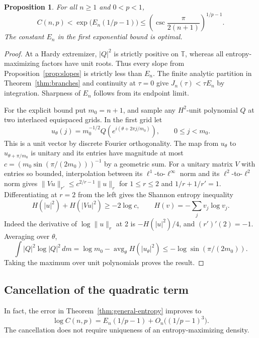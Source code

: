 \documentclass[11pt]{article}
\newtheorem{proposition}[theorem]{Proposition}
\newcommand{\T}{\mathbb T}
\begin{document}
\begin{proposition}
For all \(n\geq1\) and \(0<p<1\),
\[
 C(n,p)<\exp\bigl(E_n(1/p-1)\bigr)
 \leq \left(\csc\frac{\pi}{2(n+1)}\right)^{1/p-1}.
\]
The constant \(E_n\) in the first exponential bound is optimal.
\end{proposition}

\begin{proof}
At a Hardy extremizer, \(|Q|^2\) is strictly positive on
\(\T\), whereas all entropy-maximizing factors have unit roots.
Thus every slope from Proposition~\ref{prop:slopes} is strictly
less than \(E_n\). The finite analytic partition in
Theorem~\ref{thm:branches} and continuity at \(\tau=0\) give
\(J_n(\tau)<\tau E_n\) by integration. Sharpness of \(E_n\)
follows from its endpoint limit.

For the explicit bound put \(m_0=n+1\), and sample any
\(H^2\)-unit polynomial \(Q\) at two interlaced equispaced
grids. In the first grid let
\[
 u_\theta(j)=m_0^{-1/2}
      Q\!\left(e^{i(\theta+2\pi j/m_0)}\right),
 \qquad 0\leq j<m_0 .
\]
This is a unit vector by discrete Fourier orthogonality.
The map from \(u_\theta\) to \(u_{\theta+\pi/m_0}\) is unitary
and its entries have magnitude at most
\(c=(m_0\sin(\pi/(2m_0)))^{-1}\) by a geometric sum.
For a unitary matrix \(V\) with entries so bounded, interpolation
between its \(\ell^1\)-to-\(\ell^\infty\) norm and its
\(\ell^2\)-to-\(\ell^2\) norm gives
\(\|Vu\|_{r'}\leq c^{2/r-1}\|u\|_r\) for \(1\leq r\leq2\)
and \(1/r+1/r'=1\). Differentiating at \(r=2\) from the
left gives the Shannon entropy inequality
\[
 H(|u|^2)+H(|Vu|^2)\geq-2\log c,\qquad
 H(v)=-\sum_j v_j\log v_j .
\]
Indeed the derivative of \(\log\|u\|_r\) at 2 is
\(-H(|u|^2)/4\), and \((r')'(2)=-1\).
Averaging over \(\theta\),
\[
 \int |Q|^2\log |Q|^2\,dm
   =\log m_0-\operatorname{avg}_{\theta}H(|u_\theta|^2)
   \leq-\log\sin(\pi/(2m_0)).
\]
Taking the maximum over unit polynomials proves the result.
\end{proof}

\subsection{Cancellation of the quadratic term}

In fact, the error in Theorem~\ref{thm:general-entropy} improves to
\begin{equation}\label{eq:general-hardy-endpoint-cubic}
 \log C(n,p)=E_n(1/p-1)+O_n\bigl((1/p-1)^3\bigr).
\end{equation}
The cancellation does not require uniqueness of an entropy-maximizing
density.
\end{document}
